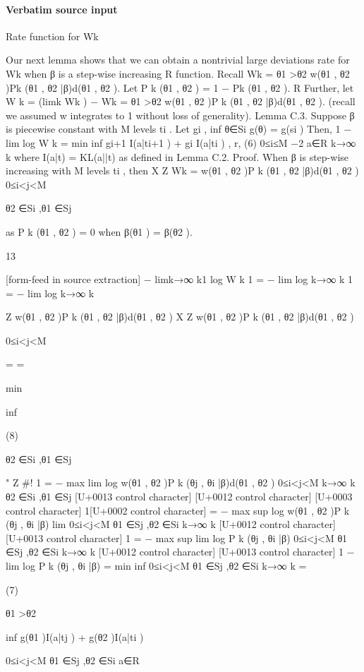 \documentclass[10pt]{article}
\begin{document}
\paragraph{Verbatim source input}
\begin{ReviewVerbatim}
Rate function for Wk

Our next lemma shows that we can obtain a nontrivial large deviations rate for Wk when β is a
step-wise increasing
R function.
Recall Wk = θ1 >θ2 w(θ1 , θ2 )Pk (θ1 , θ2 |β)d(θ1 , θ2 ).
Let P k (θ1 , θ2 ) = 1 − Pk (θ1 , θ2 ).
R
Further, let W k = (limk Wk ) − Wk = θ1 >θ2 w(θ1 , θ2 )P k (θ1 , θ2 |β)d(θ1 , θ2 ). (recall we assumed
w integrates to 1 without loss of generality).
Lemma C.3. Suppose β is piecewise constant with M levels {ti }. Let gi , inf θ∈Si g(θ) = g(si )
Then,
1
− lim log W k = min inf {gi+1 I(a|ti+1 ) + gi I(a|ti )} , r,
(6)
0≤i≤M −2 a∈R
k→∞ k
where I(a|t) = KL(a||t) as defined in Lemma C.2.
Proof. When β is step-wise increasing with M levels {ti }, then
X Z
Wk =
w(θ1 , θ2 )P k (θ1 , θ2 |β)d(θ1 , θ2 )
0≤i<j<M

θ2 ∈Si ,θ1 ∈Sj

as P k (θ1 , θ2 ) = 0 when β(θ1 ) = β(θ2 ).

13


[form-feed in source extraction]
− limk→∞ k1 log W k
1
= − lim log
k→∞ k
1
= − lim log
k→∞ k

Z
w(θ1 , θ2 )P k (θ1 , θ2 |β)d(θ1 , θ2 )
X Z
w(θ1 , θ2 )P k (θ1 , θ2 |β)d(θ1 , θ2 )

0≤i<j<M

=
=

min

inf

(8)

θ2 ∈Si ,θ1 ∈Sj

" Z
#!
1
= − max
lim
log
w(θ1 , θ2 )P k (θj , θi |β)d(θ1 , θ2 )
0≤i<j<M k→∞ k
θ2 ∈Si ,θ1 ∈Sj
[U+0013 control character]
[U+0012 control character]
[U+0003 control character]
1[U+0002 control character]
= − max
sup
log w(θ1 , θ2 )P k (θj , θi |β)
lim
0≤i<j<M θ1 ∈Sj ,θ2 ∈Si k→∞ k
[U+0012 control character]
[U+0013 control character]
1
= − max
sup
lim log P k (θj , θi |β)
0≤i<j<M θ1 ∈Sj ,θ2 ∈Si k→∞ k
[U+0012 control character]
[U+0013 control character]
1
− lim log P k (θj , θi |β)
= min
inf
0≤i<j<M θ1 ∈Sj ,θ2 ∈Si
k→∞ k
=

(7)

θ1 >θ2

inf {g(θ1 )I(a|tj ) + g(θ2 )I(a|ti )}

0≤i<j<M θ1 ∈Sj ,θ2 ∈Si a∈R


\end{ReviewVerbatim}
\end{document}
